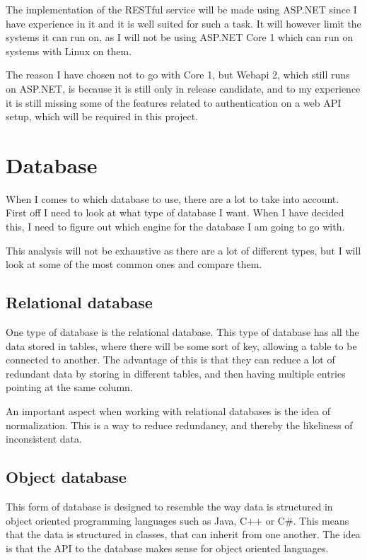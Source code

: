 The implementation of the RESTful service will be made using ASP.NET since I
have experience in it and it is well suited for such a task. It will however
limit the systems it can run on, as I will not be using ASP.NET Core 1 which can
run on systems with Linux on them\cite{asp5:intro}. 

The reason I have chosen not to go with Core 1, but Webapi 2, which still runs
on ASP.NET, is because it is still only in release
candidate\cite{asp_core_1:roadmap}, and to my experience it is still missing
some of the features related to authentication on a web API setup, which will be
required in this project. 

\section{Database }
\label{sec:Database_engine}
When I comes to which database to use, there are a lot to take into account.
First off I need to look at what type of database I want. When I have decided
this, I need to figure out which engine for the database I am going to go with.

This analysis will not be exhaustive as there are a lot of different types, but
I will look at some of the most common ones and compare them. 

\subsection{Relational database}
\label{sub:Relational database}
One type of database is the relational database. This type of database has all
the data stored in tables, where there will be some sort of key, allowing a
table to be connected to another. The advantage of this is that they can reduce
a lot of redundant data by storing in different tables, and then having multiple
entries pointing at the same column\cite{ibm:choosing_dbms}. 

An important aspect when working with relational databases is the idea of
normalization. This is a way to reduce redundancy, and thereby the likeliness
of inconsistent data. 

\subsection{Object database}
\label{sub:Object database}
This form of database is designed to resemble the way data is structured in
object oriented programming languages such as Java, C++ or C\#. This means that
the data is structured in classes, that can inherit from one another. The idea
is that the API to the database makes sense for object oriented languages. 

